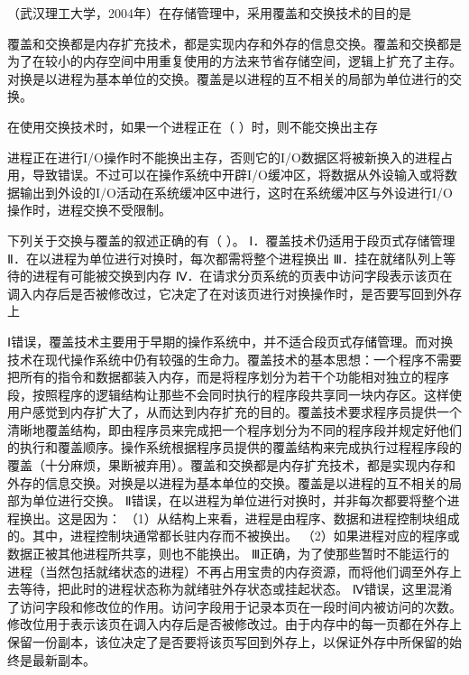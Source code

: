 \question （武汉理工大学，2004年）在存储管理中，采用覆盖和交换技术的目的是
\par{}
\begin{solution}覆盖和交换都是内存扩充技术，都是实现内存和外存的信息交换。覆盖和交换都是为了在较小的内存空间中用重复使用的方法来节省存储空间，逻辑上扩充了主存。对换是以进程为基本单位的交换。覆盖是以进程的互不相关的局部为单位进行的交换。
\end{solution}
\question 在使用交换技术时，如果一个进程正在（ ）时，则不能交换出主存
\par{}
\begin{solution}进程正在进行I/O操作时不能换出主存，否则它的I/O数据区将被新换入的进程占用，导致错误。不过可以在操作系统中开辟I/O缓冲区，将数据从外设输入或将数据输出到外设的I/O活动在系统缓冲区中进行，这时在系统缓冲区与外设进行I/O操作时，进程交换不受限制。
\end{solution}
\question 下列关于交换与覆盖的叙述正确的有（ ）。
Ⅰ．覆盖技术仍适用于段页式存储管理
Ⅱ．在以进程为单位进行对换时，每次都需将整个进程换出
Ⅲ．挂在就绪队列上等待的进程有可能被交换到内存
Ⅳ．在请求分页系统的页表中访问字段表示该页在调入内存后是否被修改过，它决定了在对该页进行对换操作时，是否要写回到外存上
\par{}
\begin{solution}Ⅰ错误，覆盖技术主要用于早期的操作系统中，并不适合段页式存储管理。而对换技术在现代操作系统中仍有较强的生命力。覆盖技术的基本思想：一个程序不需要把所有的指令和数据都装入内存，而是将程序划分为若干个功能相对独立的程序段，按照程序的逻辑结构让那些不会同时执行的程序段共享同一块内存区。这样使用户感觉到内存扩大了，从而达到内存扩充的目的。覆盖技术要求程序员提供一个清晰地覆盖结构，即由程序员来完成把一个程序划分为不同的程序段并规定好他们的执行和覆盖顺序。操作系统根据程序员提供的覆盖结构来完成执行过程程序段的覆盖（十分麻烦，果断被弃用）。覆盖和交换都是内存扩充技术，都是实现内存和外存的信息交换。对换是以进程为基本单位的交换。覆盖是以进程的互不相关的局部为单位进行交换。
Ⅱ错误，在以进程为单位进行对换时，并非每次都要将整个进程换出。这是因为：
（1）从结构上来看，进程是由程序、数据和进程控制块组成的。其中，进程控制块通常都长驻内存而不被换出。
（2）如果进程对应的程序或数据正被其他进程所共享，则也不能换出。
Ⅲ正确，为了使那些暂时不能运行的进程（当然包括就绪状态的进程）不再占用宝贵的内存资源，而将他们调至外存上去等待，把此时的进程状态称为就绪驻外存状态或挂起状态。
Ⅳ错误，这里混淆了访问字段和修改位的作用。访问字段用于记录本页在一段时间内被访问的次数。修改位用于表示该页在调入内存后是否被修改过。由于内存中的每一页都在外存上保留一份副本，该位决定了是否要将该页写回到外存上，以保证外存中所保留的始终是最新副本。
\end{solution}
